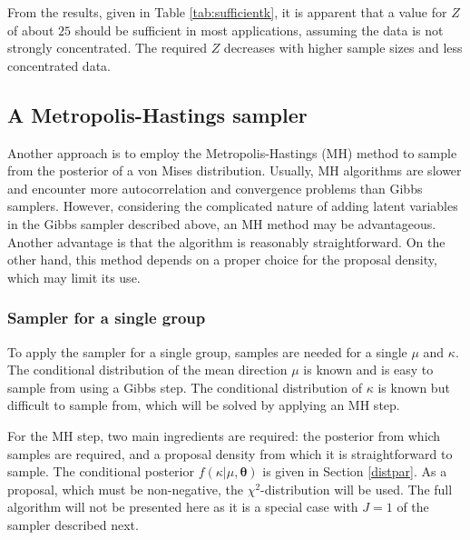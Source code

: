 \documentclass[bib]{ba/ba}
\begin{document}
From the results, given in Table \ref{tab:sufficientk}, it is apparent that a value for $Z$ of about $25$ should be sufficient in most applications, assuming the data is not strongly concentrated. The required $Z$ decreases with higher sample sizes and less concentrated data.



\subsection{A Metropolis-Hastings sampler \label{vmmh}}

Another approach is to employ the Metropolis-Hastings (MH) method \citep{metropolis1953equation, hastings1970monte} to sample from the posterior of a von Mises distribution. Usually, MH algorithms are slower and encounter more autocorrelation and convergence problems than Gibbs samplers. However, considering the complicated nature of adding latent variables in the Gibbs sampler described above, an MH method may be advantageous. Another advantage is that the algorithm is reasonably straightforward. On the other hand, this method depends on a proper choice for the proposal density, which may limit its use.


\subsubsection{Sampler for a single group}

To apply the sampler for a single group, samples are needed for a single $\mu$ and $\kappa$. The conditional distribution of the mean direction $\mu$ is known and is easy to sample from using a Gibbs step. The conditional distribution of $\kappa$ is known but difficult to sample from, which will be solved by applying an MH step. 

For the MH step, two main ingredients are required: the posterior from which samples are required, and a proposal density from which it is straightforward to sample. The conditional posterior $f(\kappa \vert \mu, \boldsymbol\theta)$ is given in Section \ref{distpar}. As a proposal, which must be non-negative, the $\chi^2$-distribution will be used. The full algorithm will not be presented here as it is a special case with $J=1$ of the sampler described next. 
\end{document}
